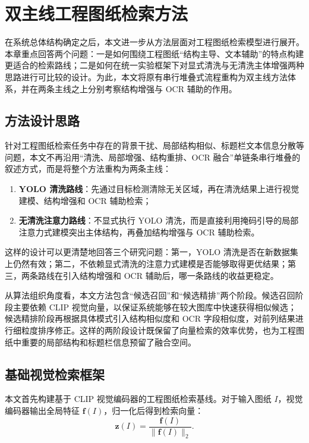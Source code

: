 \chapter{双主线工程图纸检索方法}

在系统总体结构确定之后，本文进一步从方法层面对工程图纸检索模型进行展开。本章重点回答两个问题：一是如何围绕工程图纸“结构主导、文本辅助”的特点构建更适合的检索路线；二是如何在统一实验框架下对显式清洗与无清洗主体增强两种思路进行可比较的设计。为此，本文将原有串行堆叠式流程重构为双主线方法体系，并在两条主线之上分别考察结构增强与 OCR 辅助的作用。

\section{方法设计思路}

针对工程图纸检索任务中存在的背景干扰、局部结构相似、标题栏文本信息分散等问题，本文不再沿用“清洗、局部增强、结构重排、OCR 融合”单链条串行堆叠的叙述方式，而是将整个方法重构为两条主线：
\begin{enumerate}
  \item \textbf{YOLO 清洗路线}：先通过目标检测清除无关区域，再在清洗结果上进行视觉建模、结构增强和 OCR 辅助检索；
  \item \textbf{无清洗注意力路线}：不显式执行 YOLO 清洗，而是直接利用掩码引导的局部注意力式建模突出主体结构，再叠加结构增强与 OCR 辅助检索。
\end{enumerate}

这样的设计可以更清楚地回答三个研究问题：第一，YOLO 清洗是否在新数据集上仍然有效；第二，不依赖显式清洗的注意力式建模是否能够取得更优结果；第三，两条路线在引入结构增强和 OCR 辅助后，哪一条路线的收益更稳定。

从算法组织角度看，本文方法包含“候选召回”和“候选精排”两个阶段。候选召回阶段主要依赖 CLIP 视觉向量，以保证系统能够在较大图库中快速获得相似候选；候选精排阶段再根据具体模式引入结构相似度和 OCR 字段相似度，对前列结果进行细粒度排序修正。这样的两阶段设计既保留了向量检索的效率优势，也为工程图纸中重要的局部结构和标题栏信息预留了融合空间。

\section{基础视觉检索框架}

本文首先构建基于 CLIP 视觉编码器的工程图纸检索基线。对于输入图纸 $I$，视觉编码器输出全局特征 $\bm{f}(I)$，归一化后得到检索向量：
\begin{equation}
  \bm{z}(I)=\frac{\bm{f}(I)}{\|\bm{f}(I)\|_2}.
  \label{eq:baseline-embedding-new}
\end{equation}

